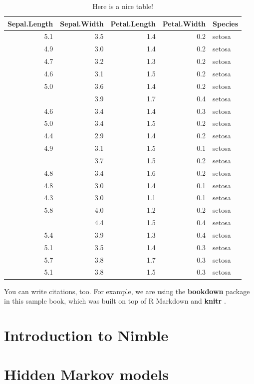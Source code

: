 \documentclass[
  12pt,
]{krantz}
\begin{document}
\begin{table}

\caption{\label{tab:nice-tab}Here is a nice table!}
\centering
\begin{tabular}[t]{rrrrl}
\toprule
Sepal.Length & Sepal.Width & Petal.Length & Petal.Width & Species\\
\midrule
5.1 & 3.5 & 1.4 & 0.2 & setosa\\
4.9 & 3.0 & 1.4 & 0.2 & setosa\\
4.7 & 3.2 & 1.3 & 0.2 & setosa\\
4.6 & 3.1 & 1.5 & 0.2 & setosa\\
5.0 & 3.6 & 1.4 & 0.2 & setosa\\
\addlinespace
5.4 & 3.9 & 1.7 & 0.4 & setosa\\
4.6 & 3.4 & 1.4 & 0.3 & setosa\\
5.0 & 3.4 & 1.5 & 0.2 & setosa\\
4.4 & 2.9 & 1.4 & 0.2 & setosa\\
4.9 & 3.1 & 1.5 & 0.1 & setosa\\
\addlinespace
5.4 & 3.7 & 1.5 & 0.2 & setosa\\
4.8 & 3.4 & 1.6 & 0.2 & setosa\\
4.8 & 3.0 & 1.4 & 0.1 & setosa\\
4.3 & 3.0 & 1.1 & 0.1 & setosa\\
5.8 & 4.0 & 1.2 & 0.2 & setosa\\
\addlinespace
5.7 & 4.4 & 1.5 & 0.4 & setosa\\
5.4 & 3.9 & 1.3 & 0.4 & setosa\\
5.1 & 3.5 & 1.4 & 0.3 & setosa\\
5.7 & 3.8 & 1.7 & 0.3 & setosa\\
5.1 & 3.8 & 1.5 & 0.3 & setosa\\
\bottomrule
\end{tabular}
\end{table}

You can write citations, too. For example, we are using the \textbf{bookdown} package \citep{R-bookdown} in this sample book, which was built on top of R Markdown and \textbf{knitr} \citep{xie2015}.

\hypertarget{intronimble}{%
\chapter{Introduction to Nimble}\label{intronimble}}

\hypertarget{hmmcapturerecapture}{%
\chapter{Hidden Markov models}\label{hmmcapturerecapture}}
\end{document}
